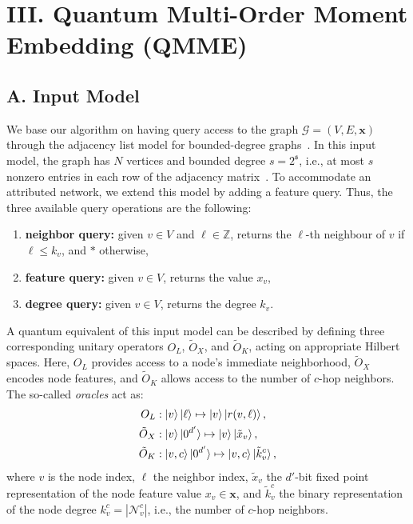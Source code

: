 \documentclass[
  reprint,
  superscriptaddress,
  amsmath,amssymb,
  aps,prl,
]{revtex4-2}
\begin{document}
%
%
\FloatBarrier
\section{III. Quantum Multi-Order Moment Embedding (QMME)}
\label{sec:big-QMME}
%
%
%
\subsection{A. Input Model}
\label{sec:input-model}
%
%
%
\noindent We base our algorithm on having query access to the graph \(\mathcal G=(V,E,\boldsymbol x)\) through the adjacency list model for bounded-degree graphs~\cite{goldreich1997property,goldreich2017introduction, ben2024symmetries}. In this input model, the graph has \(N\) vertices and bounded degree \(s=2^{\mathfrak s}\), i.e., at most \(s\) nonzero entries in each row of the adjacency matrix~\cite{lin2022lecture, camps2024explicit}. To accommodate an attributed network, we extend this model by adding a feature query. Thus, the three available query operations are the following:
\begin{enumerate}
    \item \textbf{neighbor query:} given \(v \in V\) and \(\ell \in \mathbb Z\), returns the \(\ell\)-th neighbour of \(v\) if \(\ell \leq k_v\), and \(*\) otherwise,
    \item \textbf{feature query:} given \(v \in V\), returns the value \(x_v\),
    \item \textbf{degree query:} given \(v \in V\), returns the degree \(k_v\).
\end{enumerate}
\noindent A quantum equivalent of this input model can be described by defining three corresponding unitary operators \(O_L\), \(\tilde O_X\), and \(\tilde O_K\), acting on appropriate Hilbert spaces. Here, \(O_L\) provides access to a node's immediate neighborhood, \(\tilde O_X\) encodes node features, and \(\tilde O_K\) allows access to the number of \(c\)-hop neighbors. The so-called \textit{oracles} act as:
\begin{align}
    O_L &:\ket{v} \ket{\ell} \mapsto \ket{v}\ket{r(v,\ell)}, \\
    \tilde O_X &: \ket{v}\ket{0^{d'}} \mapsto \ket{v}\ket{\tilde x_v}, \\
    \tilde O_K &: \ket{v, c}\ket{0^{d'}} \mapsto \ket{v, c} \ket{\tilde k_v^c},
    \label{eq:input-model-oracles}
\end{align}
\noindent where \(v\) is the node index, \(\ell\) the neighbor index, \(\tilde x_v\) the \(d'\)-bit fixed point representation of the node feature value \(x_v \in \boldsymbol x\), and \(\tilde k_v^c\) the binary representation of the node degree \(k_v^c=|\mathcal{N}^c_v|\), i.e., the number of \(c\)-hop neighbors. 
\end{document}
